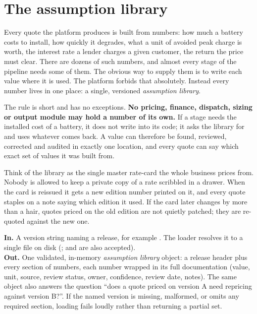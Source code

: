 \chapter{The assumption library}
\label{ch:assumptions}

Every quote the platform produces is built from numbers: how much a battery costs to install, how quickly it degrades, what a unit of avoided peak charge is worth, the interest rate a lender charges a given customer, the return the price must clear. There are dozens of such numbers, and almost every stage of the pipeline needs some of them. The obvious way to supply them is to write each value where it is used. The platform forbids that absolutely. Instead every number lives in one place: a single, versioned \emph{assumption library}.

The rule is short and has no exceptions. \textbf{No pricing, finance, dispatch, sizing or output module may hold a number of its own.} If a stage needs the installed cost of a battery, it does not write  into its code; it asks the library for  and uses whatever comes back. A value can therefore be found, reviewed, corrected and audited in exactly one location, and every quote can say which exact set of values it was built from.

\begin{plainnote}
Think of the library as the single master rate-card the whole business prices from. Nobody is allowed to keep a private copy of a rate scribbled in a drawer. When the card is reissued it gets a new edition number printed on it, and every quote staples on a note saying which edition it used. If the card later changes by more than a hair, quotes priced on the old edition are not quietly patched; they are re-quoted against the new one.
\end{plainnote}


\begin{contract}
\textbf{In.} A version string naming a release, for example . The loader resolves it to a single file on disk (;  and  are also accepted).\\
\textbf{Out.} One validated, in-memory \emph{assumption library} object: a release header plus every section of numbers, each number wrapped in its full documentation (value, unit, source, review status, owner, confidence, review date, notes). The same object also answers the question ``does a quote priced on version A need repricing against version B?''. If the named version is missing, malformed, or omits any required section, loading fails loudly rather than returning a partial set.
\end{contract}

